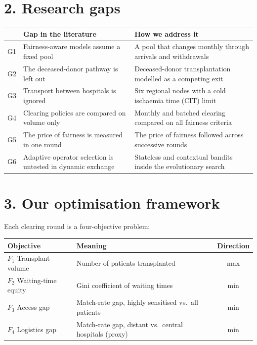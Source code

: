 \documentclass[10pt]{article}
\begin{document}
\section*{2. Research gaps}
\begin{center}
\small
\begin{tabularx}{\textwidth}{@{}p{0.55cm}p{5.2cm}L@{}}
\toprule
 & Gap in the literature & How we address it \\
\midrule
G1 & Fairness-aware models assume a fixed pool
   & A pool that changes monthly through arrivals and withdrawals \\
G2 & The deceased-donor pathway is left out
   & Deceased-donor transplantation modelled as a competing exit \\
G3 & Transport between hospitals is ignored
   & Six regional nodes with a cold ischaemia time (CIT) limit \\
G4 & Clearing policies are compared on volume only
   & Monthly and batched clearing compared on all fairness criteria \\
G5 & The price of fairness is measured in one round
   & The price of fairness followed across successive rounds \\
G6 & Adaptive operator selection is untested in dynamic exchange
   & Stateless and contextual bandits inside the evolutionary search \\
\bottomrule
\end{tabularx}
\end{center}

\section*{3. Our optimisation framework}
Each clearing round is a four-objective problem:

\begin{center}
\small
\begin{tabular}{@{}llc@{}}
\toprule
Objective & Meaning & Direction \\
\midrule
$F_1$ Transplant volume   & Number of patients transplanted & max \\
$F_2$ Waiting-time equity & Gini coefficient of waiting times & min \\
$F_3$ Access gap          & Match-rate gap, highly sensitised vs.\ all patients & min \\
$F_4$ Logistics gap       & Match-rate gap, distant vs.\ central hospitals (proxy) & min \\
\bottomrule
\end{tabular}
\end{center}
\end{document}
